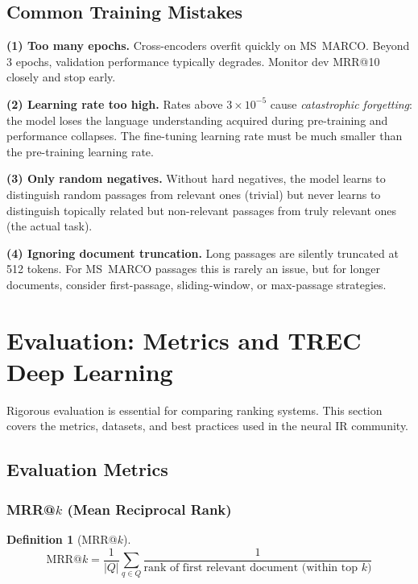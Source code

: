 \documentclass[11pt,a4paper]{article}
\theoremstyle{definition}
\newtheorem{definition}{Definition}[section]
\theoremstyle{plain}
\begin{document}
\subsection{Common Training Mistakes}

\begin{pitfall}
\textbf{(1) Too many epochs.} Cross-encoders overfit quickly on MS~MARCO. Beyond 3 epochs, validation performance typically degrades. Monitor dev MRR@10 closely and stop early.

\textbf{(2) Learning rate too high.} Rates above $3 \times 10^{-5}$ cause \emph{catastrophic forgetting}: the model loses the language understanding acquired during pre-training and performance collapses. The fine-tuning learning rate must be much smaller than the pre-training learning rate.

\textbf{(3) Only random negatives.} Without hard negatives, the model learns to distinguish random passages from relevant ones (trivial) but never learns to distinguish topically related but non-relevant passages from truly relevant ones (the actual task).

\textbf{(4) Ignoring document truncation.} Long passages are silently truncated at 512 tokens. For MS~MARCO passages this is rarely an issue, but for longer documents, consider first-passage, sliding-window, or max-passage strategies.
\end{pitfall}


\section{Evaluation: Metrics and TREC Deep Learning}
\label{sec:evaluation}

Rigorous evaluation is essential for comparing ranking systems. This section covers the metrics, datasets, and best practices used in the neural IR community.

\subsection{Evaluation Metrics}

\subsubsection{MRR@$k$ (Mean Reciprocal Rank)}

\begin{definition}[MRR@$k$]
\begin{equation}
\text{MRR@}k = \frac{1}{|Q|} \sum_{q \in Q} \frac{1}{\text{rank of first relevant document (within top } k)}
\end{equation}
\end{definition}
\end{document}

